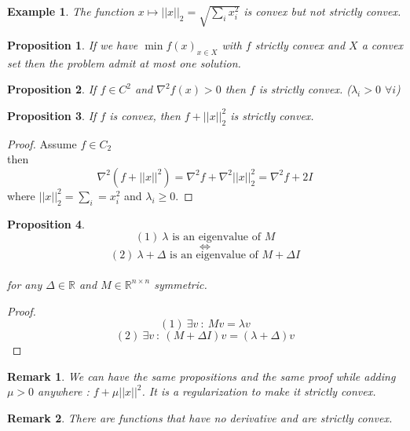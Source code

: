 \documentclass[12pt,a4paper]{article}
\newtheorem{prop}{Proposition}
\newtheorem{exmp}{Example}[section]
\newtheorem{remark}{Remark}
\begin{document}
\begin{exmp}
The function $x \mapsto ||x||_{2} = \sqrt{\sum_{i} x_{i}^{2}}$ is convex but not strictly convex.
\end{exmp}
\begin{prop}
If we have $\min f(x)_{x \in X}$ with $f$ strictly convex and $X$ a convex set then the problem admit at most one solution.
\end{prop} 
\begin{prop}
If $ f \in C^{2}$ and $\nabla^{2} f(x) > 0 $ then $f$ is strictly convex. ($\lambda_{i} > 0 $ $\forall i$)
\end{prop}
\begin{prop}
If $f$ is convex, then $ f + ||x||^{2}_{2}$ is strictly convex.
\end{prop}
\begin{proof}
Assume $f \in C_2$ 
\\then $$\nabla^{2}(f + ||x||^{2}) = \nabla^{2} f  + \nabla^{2}||x||^{2}_{2} = \nabla^{2} f + 2I
$$
where $||x||_{2}^{2} = \sum_{i} = x_{i}^{2}$ and $\lambda_{i} \geq 0$.
\end{proof}
\begin{prop}
$$(1) \ \lambda \text{ is an eigenvalue of } M$$
$$\Leftrightarrow$$
$$(2) \ \lambda + \Delta \text{ is an eigenvalue of } M + \Delta I$$
\\for any $\Delta \in \mathbb{R}$ and $M \in \mathbb{R}^{n \times n}$ symmetric.
\end{prop}
\begin{proof}
$$ (1) \ \exists v \ : \ M v = \lambda v $$
$$(2) \ \exists v \ : \ (M + \Delta I) v = ( \lambda + \Delta)v$$
\end{proof}
\begin{remark}
We can have the same propositions and the same proof while adding $\mu > 0$ anywhere : $ f + \mu ||x||^{2}$. It is a regularization to make it strictly convex.
\end{remark}
\begin{remark}
There are functions that have no derivative and are strictly convex.
\end{remark}
\end{document}
